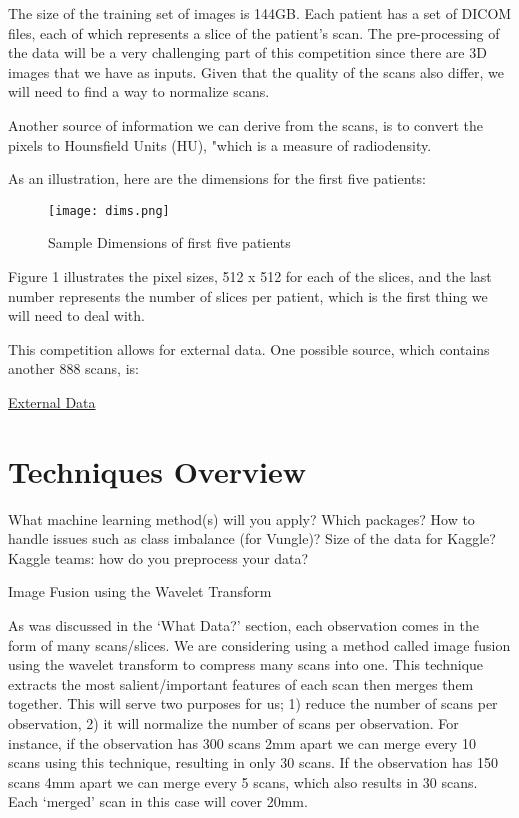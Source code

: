 \documentclass[11pt]{article}
\begin{document}
The size of the training set of images is 144GB. Each patient has a set of DICOM files, each of which represents a slice of the patient's scan. The pre-processing of the data will be a very challenging part of this competition since there are 3D images that we have as inputs. Given that the quality of the scans also differ, we will need to find a way to normalize scans. 

Another source of information we can derive from the scans, is to convert the pixels to Hounsfield Units (HU), "which is a measure of radiodensity. 

As an illustration, here are the dimensions for the first five patients:


\begin{figure}
\centering
\texttt{[image: dims.png]}
\caption{\label{fig:Dimensions}Sample Dimensions of first five patients}
\end{figure}

Figure 1 illustrates the pixel sizes, 512 x 512 for each of the slices, and the last number represents the number of slices per patient, which is the first thing we will need to deal with.

This competition allows for external data. One possible source, which contains another 888 scans, is:

\href{https://luna16.grand-challenge.org/data/}{External Data}



\section{Techniques Overview}
What machine learning method(s) will you apply? Which packages?
How to handle issues such as class imbalance (for Vungle)? Size of the data for Kaggle? 
Kaggle teams: how do you preprocess your data?


Image Fusion using the Wavelet Transform


As was discussed in the ‘What Data?’ section, each observation comes in the form of many scans/slices. We are considering using a method called image fusion using the wavelet transform to compress many scans into one. This technique extracts the most salient/important features of each scan then merges them together. This will serve two purposes for us; 1) reduce the number of scans per observation, 2) it will normalize the number of scans per observation. For instance, if the observation has 300 scans 2mm apart we can merge every 10 scans using this technique, resulting in only 30 scans. If the observation has 150 scans 4mm apart we can merge every 5 scans, which also results in 30 scans. Each ‘merged’ scan in this case will cover 20mm.
\end{document}

